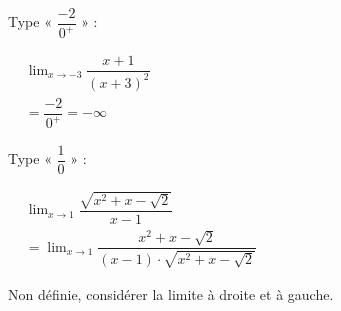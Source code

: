 {\begin{tasks}
\task Type « $\dfrac{-2}{0^+}$ » :

\( \begin{aligned}
&\lim_{x \to -3} \dfrac{x + 1}{(x + 3)^2}\\
&= \dfrac{-2}{0^+} = -\infty
\end{aligned} \)

\task Type « $\dfrac{1}{0}$ » :

\( \begin{aligned}
&\lim_{x \to 1} \dfrac{\sqrt{x^2 + x - \sqrt{2}}}{x - 1}\\
&=\lim_{x\to 1}\dfrac{x^2+x-\sqrt{2}}{(x-1)\cdot \sqrt{x^2+x-\sqrt{2}}}
\end{aligned} \)

Non définie, considérer la limite à droite et à gauche. 

\end{tasks}
}

